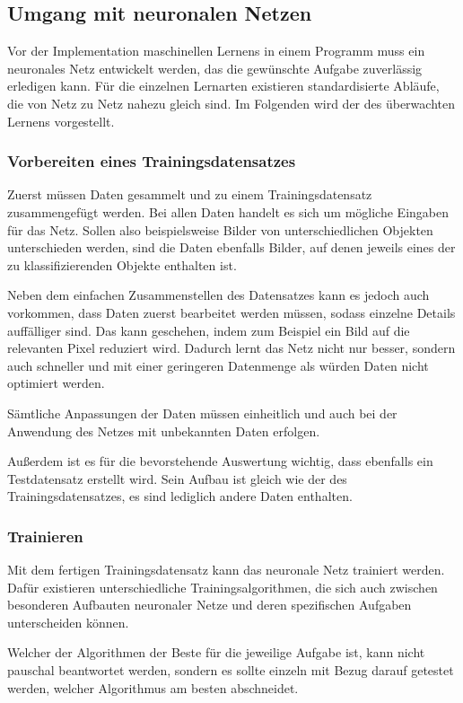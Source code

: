 \documentclass[12pt,a4]{article}
\begin{document}
\subsection{Umgang mit neuronalen Netzen \cite{PythonMachineLearningChapter1}}
Vor der Implementation maschinellen Lernens in einem Programm muss ein neuronales Netz entwickelt werden, das die gewünschte Aufgabe zuverlässig erledigen kann. Für die einzelnen Lernarten existieren standardisierte Abläufe, die von Netz zu Netz nahezu gleich sind. Im Folgenden wird der des überwachten Lernens vorgestellt.

\subsubsection{Vorbereiten eines Trainingsdatensatzes}
Zuerst müssen Daten gesammelt und zu einem Trainingsdatensatz zusammengefügt werden.
Bei allen Daten handelt es sich um mögliche Eingaben für das Netz. Sollen also beispielsweise Bilder von unterschiedlichen Objekten unterschieden werden, sind die Daten ebenfalls Bilder, auf denen jeweils eines der zu klassifizierenden Objekte enthalten ist.

Neben dem einfachen Zusammenstellen des Datensatzes kann es jedoch auch vorkommen, dass Daten zuerst bearbeitet werden müssen, sodass einzelne Details auffälliger sind. Das kann geschehen, indem zum Beispiel ein Bild auf die relevanten Pixel reduziert wird. Dadurch lernt das Netz nicht nur besser, sondern auch schneller und mit einer geringeren Datenmenge als würden Daten nicht optimiert werden.

Sämtliche Anpassungen der Daten müssen einheitlich und auch bei der Anwendung des Netzes mit unbekannten Daten erfolgen.

Außerdem ist es für die bevorstehende Auswertung wichtig, dass ebenfalls ein Testdatensatz erstellt wird. Sein Aufbau ist gleich wie der des Trainingsdatensatzes, es sind lediglich andere Daten enthalten. 

\subsubsection{Trainieren}
Mit dem fertigen Trainingsdatensatz kann das neuronale Netz trainiert werden. Dafür existieren unterschiedliche Trainingsalgorithmen, die sich auch zwischen besonderen Aufbauten neuronaler Netze und deren spezifischen Aufgaben unterscheiden können. 

Welcher der Algorithmen der Beste für die jeweilige Aufgabe ist, kann nicht pauschal beantwortet werden, sondern es sollte einzeln mit Bezug darauf getestet werden, welcher Algorithmus am besten abschneidet.
\end{document}
